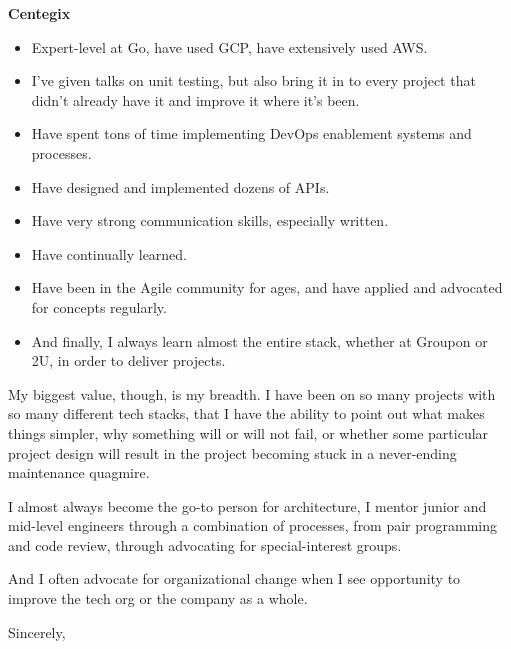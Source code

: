 \documentclass[11pt]{letter} %
\begin{document}
\begin{letter}{\large \bfseries Centegix}
\begin{itemize}
\item Expert-level at Go, have used GCP, have extensively used AWS.
\item I've given talks on unit testing, but also bring it in to every project that didn't already have it and improve it where it's been.
\item Have spent tons of time implementing DevOps enablement systems and processes.
\item Have designed and implemented dozens of APIs.
\item Have very strong communication skills, especially written.
\item Have continually learned.
\item Have been in the Agile community for ages, and have applied and advocated for concepts regularly.
\item And finally, I always learn almost the entire stack, whether at Groupon or 2U, in order to deliver projects.
\end{itemize}

My biggest value, though, is my breadth.  I have been on so many projects with so many different tech stacks,
that I have the ability to point out what makes things simpler, why something will or will not fail, or
whether some particular project design will result in the project becoming stuck in a never-ending maintenance quagmire.

I almost always become the go-to person for architecture, I mentor junior and mid-level engineers through
a combination of processes, from pair programming and code review, through advocating for special-interest
groups.

And I often advocate for organizational change when I see opportunity to improve the tech org or
the company as a whole.


\closing{Sincerely,}


\end{letter}
\end{document}
